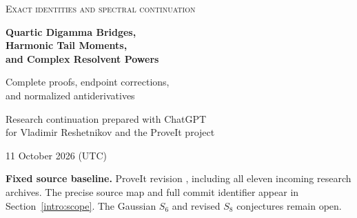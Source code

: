 

\begin{titlepage}
\thispagestyle{empty}
\vspace*{10mm}
\begin{center}
{\small\scshape Exact identities and spectral continuation\par}
\vspace{10mm}
{\LARGE\bfseries Quartic Digamma Bridges,\\[4pt]
Harmonic Tail Moments,\\[4pt]
and Complex Resolvent Powers\par}
\vspace{8mm}
{\large Complete proofs, endpoint corrections,\\
and normalized antiderivatives\par}
\vspace{10mm}
{Research continuation prepared with ChatGPT\\
for Vladimir Reshetnikov and the ProveIt project\par}
\vspace{3mm}
{11 October 2026 (UTC)\par}
\end{center}
\vspace{7mm}
\begin{abstract}
We resolve three concrete parts of the current ProveIt research agenda.
First, we evaluate the coordinate finite part of the fourth power of
the digamma function through the linear Laurent coefficient of the
strict depth-three harmonic zeta function, with every lower-depth and
endpoint correction explicit. A normally convergent global
partial-fraction identity supplies a normalized primitive and an
all-order polygamma hierarchy. Second, we evaluate every centered
nonpositive even moment of a product of two even harmonic tails by a
finite Bernoulli formula. For each pair of tail orders the entire
moment sequence belongs to one fixed span of ordinary zeta values and
products, and its convergent generating function reduces to finitely
many classical polylogarithms. The first mixed pair is generated
rationally by its first four moments. Third, we extend the cotangent
resolvent transform to arbitrary complex powers and complete its joint
Stieltjes germ at every integer power. The completion includes a finite
endpoint term that remains nonzero when the apparent pole is removable.
It gives all logarithmic powers, exact parameter derivatives, and
normalized primitives. An independent Gamma--Gauss generator evaluates
all ordinary polynomial moments. We separate these proofs from
computational diagnostics, record the source audit, and identify the
remaining arithmetic and higher-depth questions.
\end{abstract}
\vfill
\noindent\textbf{Fixed source baseline.} ProveIt revision
\shortsnapshot, including all eleven incoming research archives.
The precise source map and full commit identifier appear in
Section~\ref{intro:scope}. The Gaussian $S_6$ and revised $S_8$
conjectures remain open.
\end{titlepage}
